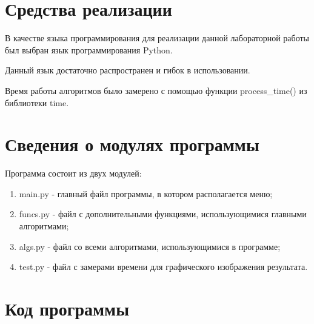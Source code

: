 \section{Средства реализации}

В качестве языка программирования для реализации данной лабораторной работы был выбран язык программирования Python. 

Данный язык достаточно распространен и гибок в использовании. 

Время работы алгоритмов было замерено с помощью функции process\_time() из библиотеки time.

\section{Сведения о модулях программы}
Программа состоит из двух модулей:
\begin{enumerate}
	\item main.py - главный файл программы, в котором располагается меню;
	\item funcs.py - файл с дополнительными функциями, использующимися главными алгоритмами; 
	\item algs.py - файл со всеми алгоритмами, использующимися в программе;
	\item test.py - файл с замерами времени для графического изображения результата.
\end{enumerate}


\section{Код программы}

